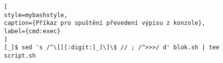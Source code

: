 \begin{lstfloat}
\begin{lstlisting}[
style=mybashstyle,
caption={Příkaz pro spuštění převedení výpisu z konzole},
label={cmd:exec}
]
[_]$ sed 's /^\[[[:digit:]_]\]\$ // ; /^>>>/ d' blok.sh | tee script.sh
\end{lstlisting}
\end{lstfloat}